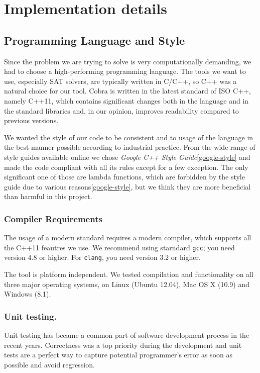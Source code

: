 \chapter{Implementation details}

\section{Programming Language and Style}

Since the problem we are trying to solve is very computationally demanding,
  we had to choose a high-performing programming language.
The tools we want to use, especially SAT solvers, are typically written in C/C++,
  so C++ was a natural choice for our tool.
Cobra is written in the latest standard of ISO C++, namely C++11, which
  contains significant changes both in the language and in the standard libraries
  and, in our opinion, improves readability compared to previous versions.

We wanted the style of our code to be consistent and to usage of the language in the best
 manner possible according to industrial practice.
From the wide range of style guides available online
 we chose \emph{Google C++ Style Guide}\ref{google-style} and made
 the code compliant with all its rules except for a few exception.
The only significant one of those are lambda functions, which are forbidden
 by the style guide due to various reasons\ref{google-style},
 but we think they are more beneficial than harmful in this project.

\subsection{Compiler Requirements}
The usage of a modern standard requires a modern compiler,
  which supports all the C++11 feautres we use.
We recommend using starndard \texttt{gcc}; you need version $4.8$ or higher.
For \texttt{clang}, you need version $3.2$ or higher.

The tool is platform independent.
  We tested compilation and functionality on
  all three major operating systems, on Linux (Ubuntu 12.04),
  Mac OS X (10.9) and Windows (8.1).

\subsection{Unit testing.}
Unit testing has became a common part of software development process
  in the recent years.
Correctness was a top priority during the development and
  unit tests are a perfect way to capture potential programmer's error
  as soon as possible and avoid regression.

